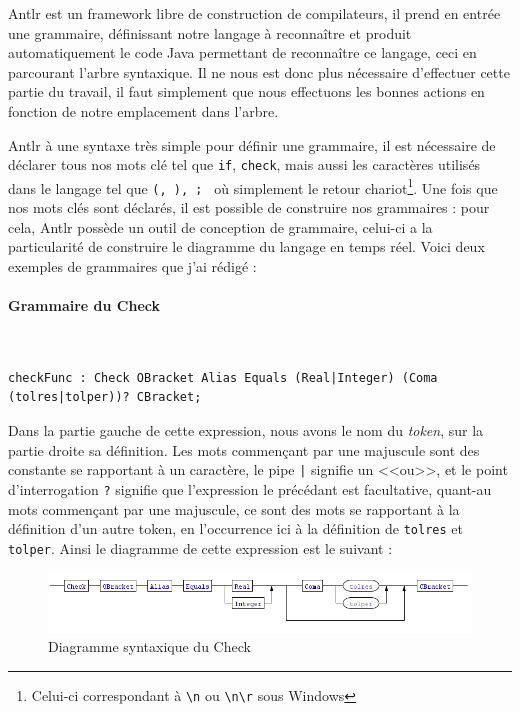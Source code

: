 		Antlr est un framework libre de construction de compilateurs, il prend en entrée une grammaire, définissant notre langage à reconnaître et produit automatiquement le code Java permettant de reconnaître ce langage, ceci en parcourant l'arbre syntaxique. Il ne nous est donc plus nécessaire d'effectuer cette partie du travail, il faut simplement que nous effectuons les bonnes actions en fonction de notre emplacement dans l'arbre.

		Antlr à une syntaxe très simple pour définir une grammaire, il est nécessaire de déclarer tous nos mots clé tel que \texttt{if}, \texttt{check}, mais aussi les caractères utilisés dans le langage tel que \texttt{(, ), {; }} où simplement le retour chariot\footnote{Celui-ci correspondant à \texttt{\textbackslash n} ou \texttt{\textbackslash  n\textbackslash r} sous Windows}. Une fois que nos mots clés sont déclarés, il est possible de construire nos grammaires : pour cela, Antlr possède un outil de conception de grammaire, celui-ci a la particularité de construire le diagramme du langage en temps réel. Voici deux exemples de grammaires que j'ai rédigé :

		\paragraph{Grammaire du Check}~\\
\begin{lstlisting}[caption=Grammaire Check, numbers=none]
checkFunc : Check OBracket Alias Equals (Real|Integer) (Coma (tolres|tolper))? CBracket;
\end{lstlisting}
Dans la partie gauche de cette expression, nous avons le nom du \textit{token}, sur la partie droite sa définition. Les mots commençant par une majuscule sont des constante se rapportant à un caractère, le pipe \texttt{|} signifie un <<ou>>, et le point d'interrogation \texttt{?} signifie que l'expression le précédant est facultative, quant-au mots commençant par une majuscule, ce sont des mots se rapportant à la définition d'un autre token, en l'occurrence ici à la définition de \texttt{tolres} et \texttt{tolper}. Ainsi le diagramme de cette expression est le suivant : 
\begin{figure}[H]
	\centering
	\includegraphics[width=18cm]{contents/images/check.png}
	\caption{Diagramme syntaxique du Check}
\end{figure}
